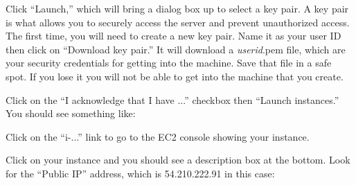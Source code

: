 \begin{fullwidth}
\step Click ``Launch,'' which will bring a dialog box up to select a key pair. A key pair is what allows you to securely access the server and prevent unauthorized access. The first time, you will need to create a new key pair. Name it as your user ID then click on ``Download key pair.'' It will download a {\em userid}.pem file, which are your security credentials for getting into the machine. Save that file in a safe spot. If you lose it you will not be able to get into the machine that you create.


\step Click on the ``I acknowledge that I have ...'' checkbox then ``Launch instances.'' You should see something like:


\step Click on the ``i-...'' link to go to the EC2 console showing your instance.


\step Click on your instance and you should see a description box at the bottom. Look for the ``Public IP'' address, which is 54.210.222.91 in this case:



\end{fullwidth}
